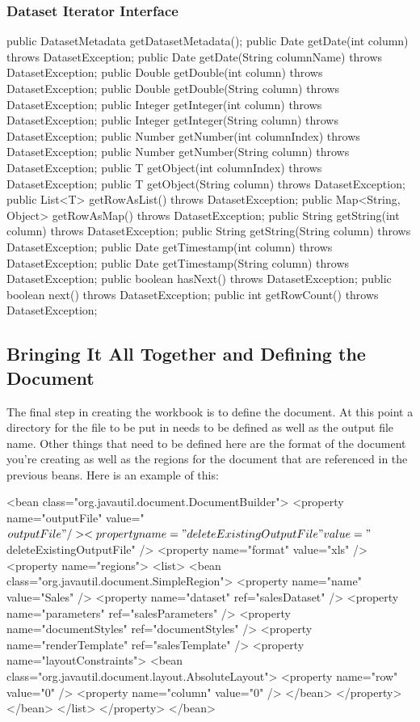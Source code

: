 \documentclass[letterpaper,10pt]{article}
\begin{document}
\subsubsection{Dataset Iterator Interface}
\begin{verbatimtab}
	public DatasetMetadata getDatasetMetadata();
	public Date getDate(int column) throws DatasetException;
	public Date getDate(String columnName) throws DatasetException;
	public Double getDouble(int column) throws DatasetException;
	public Double getDouble(String column) throws DatasetException;
	public Integer getInteger(int column) throws DatasetException;
	public Integer getInteger(String column) throws DatasetException;
	public Number getNumber(int columnIndex) throws DatasetException;
	public Number getNumber(String column) throws DatasetException;
	public T getObject(int columnIndex) throws DatasetException;
	public T getObject(String column) throws DatasetException;
	public List<T> getRowAsList() throws DatasetException;
	public Map<String, Object> getRowAsMap() throws DatasetException;
	public String getString(int column) throws DatasetException;
	public String getString(String column) throws DatasetException;
	public Date getTimestamp(int column) throws DatasetException;
	public Date getTimestamp(String column) throws DatasetException;
	public boolean hasNext() throws DatasetException;
	public boolean next() throws DatasetException;
	public int getRowCount() throws DatasetException;
\end{verbatimtab}

\subsection{Bringing It All Together and Defining the Document}
The final step in creating the workbook is to define the document.  At this point a directory for the file to be put in needs to be defined as well as the output file name.  Other things that need to be defined here are the format of the document you're creating as well as the regions for the document that are referenced in the previous beans.  Here is an example of this:

\begin{verbatimtab}
 <bean class="org.javautil.document.DocumentBuilder">
	<property name="outputFile" value="${outputFile}" />
	<property name="deleteExistingOutputFile" value="${deleteExistingOutputFile}" />
	<property name="format" value="xls" />
	<property name="regions">
		<list>
		<bean class="org.javautil.document.SimpleRegion">
			<property name="name" value="Sales" />
			<property name="dataset" ref="salesDataset" />
			<property name="parameters" ref="salesParameters" />
			<property name="documentStyles" ref="documentStyles" />
			<property name="renderTemplate" ref="salesTemplate" />
			<property name="layoutConstraints">
				<bean class="org.javautil.document.layout.AbsoluteLayout">
					<property name="row" value="0" />
					<property name="column" value="0" />
				</bean>
			</property>
		</bean>
		</list>
	</property>
</bean>
\end{verbatimtab}
\end{document}

